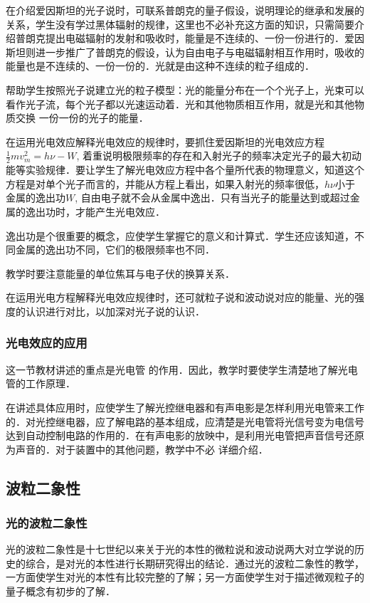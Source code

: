 在介绍爱因斯坦的光子说时，可联系普朗克的量子假设，说明理论的继承和发展的关系，学生没有学过黑体辐射的规律，这里也不必补充这方面的知识，只需简要介绍普朗克提出电磁辐射的发射和吸收时，能量是不连续的、一份一份进行的．爱因斯坦则进一步推广了普朗克的假设，认为自由电子与电磁辐射相互作用时，吸收的能量也是不连续的、一份一份的．光就是由这种不连续的粒子组成的．

帮助学生按照光子说建立光的粒子模型：光的能量分布在一个个光子上，光束可以看作光子流，每个光子都以光速运动着．光和其他物质相互作用，就是光和其他物质交换
一份一份的光子的能量．

在运用光电效应解释光电效应的规律时，要抓住爱因斯坦的光电效应方程$\frac{1}{2}mv^2_m=h\nu-W$, 着重说明极限频率的存在和入射光子的频率决定光子的最大初动能等实验规律．要让学生了解光电效应方程中各个量所代表的物理意义，知道这个方程是对单个光子而言的，并能从方程上看出，如果入射光的频率很低，$h\nu$小于金属的逸出功$W$, 自由电子就不会从金属中逸出．只有当光子的能量达到或超过金属的逸出功时，才能产生光电效应．

逸出功是个很重要的概念，应使学生掌握它的意义和计算式．学生还应该知道，不同金属的逸出功不同，它们的极限频率也不同．

教学时要注意能量的单位焦耳与电子伏的换算关系．

在运用光电方程解释光电效应规律时，还可就粒子说和波动说对应的能量、光的强度的认识进行对比，以加深对光子说的认识．

\subsubsection{光电效应的应用} 

这一节教材讲述的重点是光电管
的作用．因此，教学时要使学生清楚地了解光电管的工作原理．

在讲述具体应用时，应使学生了解光控继电器和有声电影是怎样利用光电管来工作的．对光控继电器，应了解电路的基本组成，应清楚是光电管将光信号变为电信号达到自动控制电路的作用的．在有声电影的放映中，是利用光电管把声音信号还原为声音的．对于装置中的其他问题，教学中不必
详细介绍．

\subsection{波粒二象性}
\subsubsection{光的波粒二象性}

光的波粒二象性是十七世纪以来关于光的本性的微粒说和波动说两大对立学说的历史的综合，是对光的本性进行长期研究得出的结论．通过光的波粒二象性的教学，一方面使学生对光的本性有比较完整的了解；另一方面使学生对于描述微观粒子的量子概念有初步的了解．

